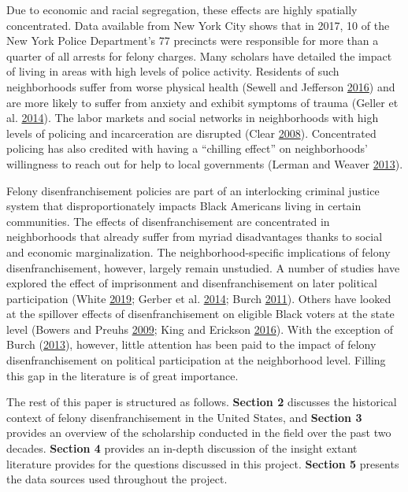 \documentclass[]{article}
\begin{document}
Due to economic and racial segregation, these effects are highly spatially concentrated. Data available from New York City shows that in 2017, 10 of the New York Police Department's 77 precincts were responsible for more than a quarter of all arrests for felony charges. Many scholars have detailed the impact of living in areas with high levels of police activity. Residents of such neighborhoods suffer from worse physical health (Sewell and Jefferson \protect\hyperlink{ref-Sewell2016}{2016}) and are more likely to suffer from anxiety and exhibit symptoms of trauma (Geller et al. \protect\hyperlink{ref-Geller2014}{2014}). The labor markets and social networks in neighborhoods with high levels of policing and incarceration are disrupted (Clear \protect\hyperlink{ref-Clear2008}{2008}). Concentrated policing has also credited with having a ``chilling effect'' on neighborhoods' willingness to reach out for help to local governments (Lerman and Weaver \protect\hyperlink{ref-Lerman2013}{2013}).

Felony disenfranchisement policies are part of an interlocking criminal justice system that disproportionately impacts Black Americans living in certain communities. The effects of disenfranchisement are concentrated in neighborhoods that already suffer from myriad disadvantages thanks to social and economic marginalization. The neighborhood-specific implications of felony disenfranchisement, however, largely remain unstudied. A number of studies have explored the effect of imprisonment and disenfranchisement on later political participation (White \protect\hyperlink{ref-White2019}{2019}; Gerber et al. \protect\hyperlink{ref-Gerber2014}{2014}; Burch \protect\hyperlink{ref-Burch2011}{2011}). Others have looked at the spillover effects of disenfranchisement on eligible Black voters at the state level (Bowers and Preuhs \protect\hyperlink{ref-Bowers2009}{2009}; King and Erickson \protect\hyperlink{ref-King2016}{2016}). With the exception of Burch (\protect\hyperlink{ref-Burch2013}{2013}), however, little attention has been paid to the impact of felony disenfranchisement on political participation at the neighborhood level. Filling this gap in the literature is of great importance.

The rest of this paper is structured as follows. \textbf{Section 2} discusses the historical context of felony disenfranchisement in the United States, and \textbf{Section 3} provides an overview of the scholarship conducted in the field over the past two decades. \textbf{Section 4} provides an in-depth discussion of the insight extant literature provides for the questions discussed in this project. \textbf{Section 5} presents the data sources used throughout the project.
\end{document}
